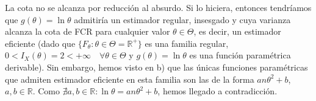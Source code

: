 \documentclass[12pt]{article}
\newcommand{\R}{\mathbb{R}}
\newcommand{\Rmas}{\R^{+}}
\begin{document}
\begin{ejercicio}[2 puntos]
\begin{enumerate}
            La cota no se alcanza por reducción al absurdo. Si lo hiciera, entonces tendríamos que $g (\theta) = \ln \theta$ admitiría
            un estimador regular, insesgado y cuya varianza alcanza la cota de FCR para cualquier valor $\theta \in \Theta$, es decir, un estimador eficiente (dado que $\{F_\theta : \theta \in \Theta = \Rmas\}$ es una familia regular, $0 < I_X(\theta) = 2 < + \infty
            \quad \forall \theta \in \Theta$ y $g(\theta) = \ln \theta$ es una función paramétrica derivable). Sin embargo, 
            hemos visto en b) que las únicas funciones paramétricas que admiten estimador eficiente en esta familia son las 
            de la forma $a n\theta^2 + b$, $a, b \in \R$. Como $\nexists a,b \in \R : \ln \theta = a n\theta^2 + b$, hemos llegado a contradicción.   
        \end{enumerate}
    \end{ejercicio}

    \newpage
\end{document}
